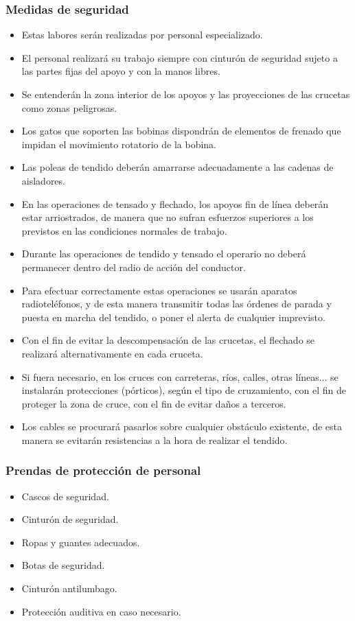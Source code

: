 \subsubsection{Medidas de seguridad}
\label{subsubsec:sysMaquinaria-MS}
\begin{itemize}
    \item Estas labores serán realizadas por personal especializado.
    \item El personal realizará su trabajo siempre con cinturón de seguridad sujeto a las partes fijas del apoyo y con la manos libres.
    \item Se entenderán la zona interior de los apoyos y las proyecciones de las crucetas como zonas peligrosas.
    \item Los gatos que soporten las bobinas dispondrán de elementos de frenado que impidan el movimiento rotatorio de la bobina.
    \item Las poleas de tendido deberán amarrarse adecuadamente a las cadenas de aisladores.
    \item En las operaciones de tensado y flechado, los apoyos fin de línea deberán estar arriostrados, de manera que no sufran esfuerzos superiores a los previstos en las condiciones normales de trabajo.
    \item Durante las operaciones de tendido y tensado el operario no deberá permanecer dentro del radio de acción del conductor.
    \item Para efectuar correctamente estas operaciones se usarán aparatos radioteléfonos, y de esta manera transmitir todas las órdenes de parada y puesta en marcha del tendido, o poner el alerta de cualquier imprevisto.
    \item Con el fin de evitar la descompensación de las crucetas, el flechado se realizará alternativamente en cada cruceta.
    \item Si fuera necesario, en los cruces con carreteras, ríos, calles, otras líneas... se instalarán protecciones (pórticos), según el tipo de cruzamiento, con el fin de proteger la zona de cruce, con el fin de evitar daños a terceros.
    \item Los cables se procurará pasarlos sobre cualquier obstáculo existente, de esta manera se evitarán resistencias a la hora de realizar el tendido.
\end{itemize}
\subsubsection{Prendas de protección de personal}
\label{subsubsec:sysMaquinaria-EPI}
\begin{itemize}
    \item Cascos de seguridad.
    \item Cinturón de seguridad.
    \item Ropas y guantes adecuados.
    \item Botas de seguridad.
    \item Cinturón antilumbago.
    \item Protección auditiva en caso necesario.
\end{itemize}
